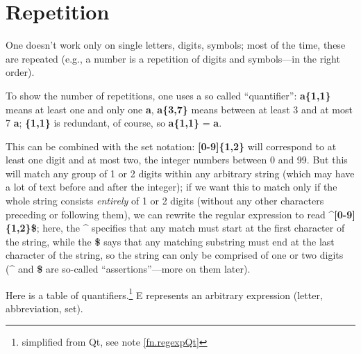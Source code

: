 \section{Repetition}

One doesn't work only on single letters, digits, symbols; most of the time, these are repeated (e.g., a number is a repetition of digits and symbols---in the right order).

To show the number of  repetitions, one uses a so called ``quantifier'': \textbf{a\{1,1\}} means at least one and only one \textbf{a}, \textbf{a\{3,7\}} means between at least 3 and at most 7 \textbf{a}; \textbf{\{1,1\}} is redundant, of course, so \textbf{a\{1,1\}} = \textbf{a}.

This can be combined with the set notation: \textbf{[0-9]\{1,2\}} will correspond to at least one digit and at most two, the integer numbers between 0 and 99. But this will match any group of 1 or 2 digits within any arbitrary string (which may have a lot of text before and after the integer); if we want this to match only if the whole string consists \emph{entirely} of 1 or 2 digits (without any other characters preceding or following them), we can rewrite the regular expression to read \textbf{\^{}[0-9]\{1,2\}\$}; here, the \textbf{\^{}} specifies that any match must start at the first character of the string, while the \textbf{\$} says that any matching substring must end at the last character of the string, so the string can only be comprised of one or two digits (\textbf{\^{}} and \textbf{\$} are so-called ``assertions''---more on them later).

Here is a table of quantifiers.\footnote{simplified from Qt, see note \ref{fn.regexpQt}} E represents an arbitrary expression (letter, abbreviation, set).
\smallskip

